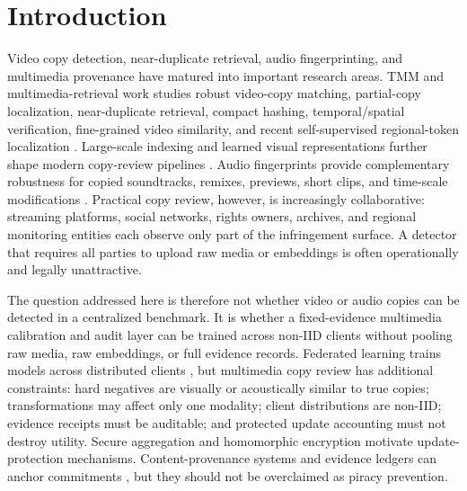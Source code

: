 \documentclass[journal]{IEEEtran}
\begin{document}
\section{Introduction}

Video copy detection, near-duplicate retrieval, audio fingerprinting, and multimedia provenance have matured into important research areas. TMM and multimedia-retrieval work studies robust video-copy matching, partial-copy localization, near-duplicate retrieval, compact hashing, temporal/spatial verification, fine-grained video similarity, and recent self-supervised regional-token localization \cite{wu2009realtime,douze2010image,chou2015pattern,song2013multiple,hao2017smvh,kordopatis2019fivr,feng2022vcsl,shao2021transvcl,lu2024selfsupervised,liu2013survey_ndvr}. Large-scale indexing and learned visual representations further shape modern copy-review pipelines \cite{rui2019survey,gosselin2021deep,johnson2019billion,radford2021clip,arnab2021vivit}. Audio fingerprints provide complementary robustness for copied soundtracks, remixes, previews, short clips, and time-scale modifications \cite{wang2003shazam,cano2005review,baluja2008waveprint,carletti2019audio,defferrard2017fma,gemmeke2017audioset}. Practical copy review, however, is increasingly collaborative: streaming platforms, social networks, rights owners, archives, and regional monitoring entities each observe only part of the infringement surface. A detector that requires all parties to upload raw media or embeddings is often operationally and legally unattractive.

The question addressed here is therefore not whether video or audio copies can be detected in a centralized benchmark. It is whether a fixed-evidence multimedia calibration and audit layer can be trained across non-IID clients without pooling raw media, raw embeddings, or full evidence records. Federated learning trains models across distributed clients \cite{mcmahan2017fedavg,kairouz2021advances,yang2019federated,li2020fedprox,karimireddy2020scaffold,reddi2021fedopt,li2021ditto}, but multimedia copy review has additional constraints: hard negatives are visually or acoustically similar to true copies; transformations may affect only one modality; client distributions are non-IID; evidence receipts must be auditable; and protected update accounting must not destroy utility. Secure aggregation \cite{bonawitz2017secureagg} and homomorphic encryption \cite{paillier1999public,cheon2017ckks,acar2018surveyhe,pham2020flhe,wang2019privacy} motivate update-protection mechanisms. Content-provenance systems and evidence ledgers can anchor commitments \cite{bui2020archangel,collomosse2019content,c2pa2026spec,weng2016multiparty,shafiq2022blockchain}, but they should not be overclaimed as piracy prevention.
\end{document}
